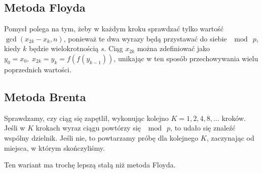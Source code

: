 \subsection{Metoda Floyda}
Pomysł polega na tym, żeby w każdym kroku sprawdzać tylko wartość \( \gcd(x_{2k} - x_k, n) \), ponieważ te dwa wyrazy będą przystawać do siebie \( \mod \ p \), kiedy \( k \) będzie wielokrotnością \( s \). Ciąg \( x_{2k} \) można zdefiniować jako \( y_0 = x_0,\; x_{2k} = y_k = f(f(y_{k-1})) \), unikając w ten sposób przechowywania wielu poprzednich wartości.


\subsection{Metoda Brenta}
Sprawdzamy, czy ciąg się zapętlił, wykonując kolejno \( K = 1, 2, 4, 8, \dots \) kroków. Jeśli w \( K \) krokach wyraz ciągu powtórzy się \( \mod \ p \), to udało się znaleźć wspólny dzielnik. Jeśli nie, to powtarzamy próbę dla kolejnego \( K \), zaczynając od miejsca, w którym skończyliśmy.

Ten wariant ma trochę lepszą stałą niż metoda Floyda.
